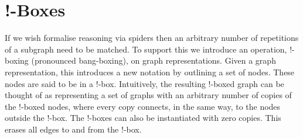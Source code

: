 \documentclass[runningheads]{llncs}
\newcommand{\vinterp}[1]{\llbracket #1 \rrbracket_v}
\begin{document}




\section{!-Boxes}

If we wish formalise reasoning via spiders then an arbitrary
number of repetitions of a subgraph need to be matched. To support
this we introduce an operation, !-boxing (pronounced bang-boxing), on
graph representations. Given a graph representation, this introduces a
new notation by outlining a set of nodes. These nodes are said to be
in a !-box. Intuitively, the resulting !-boxed graph can be thought of
as representing a set of graphs with an arbitrary number of copies of
the !-boxed nodes, where every copy connects, in the same way, to the
nodes outside the !-box. The !-boxes can also be instantiated with
zero copies. This erases all edges to and from the !-box. 
\end{document}
